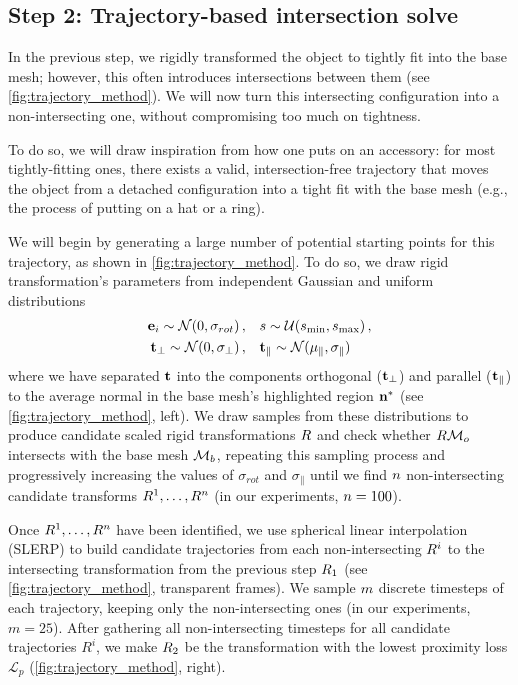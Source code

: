 \subsection{Step 2: Trajectory-based intersection solve}
\label{sec:step2}

In the previous step, we rigidly transformed the object to tightly fit into the base mesh; however, this often introduces intersections between them (see \autoref{fig:trajectory_method}). We will now turn this intersecting configuration into a non-intersecting one, without compromising too much on tightness.


To do so, we will draw inspiration from how one puts on an accessory: for most tightly-fitting ones, there exists a valid, intersection-free trajectory that moves the object from a detached configuration into a tight fit with the base mesh (e.g., the process of putting on a hat or a ring).

We will begin by generating a large number of potential starting points for this trajectory, as shown in \autoref{fig:trajectory_method}. To do so, we draw rigid transformation's parameters from independent Gaussian and uniform distributions
\begin{align*}
\mathbf{e}_i \sim \mathcal{N} (0,\sigma_{rot})\,,&\quad s \sim \mathcal{U}(s_{\min}, s_{\max})\,,\\
\mathbf{t}_{\perp} \sim \mathcal{N} (0,\sigma_{\perp})\,,&\quad \mathbf{t}_{\parallel} \sim \mathcal{N} (\mu_{\parallel},\sigma_{\parallel})
\end{align*}
where we have separated $\mathbf{t}$ into the components orthogonal ($\mathbf{t}_{\perp}$) and parallel ($\mathbf{t}_{\parallel}$) to the average normal in the base mesh's highlighted region $\mathbf{n}^*$ (see \autoref{fig:trajectory_method}, left). We draw samples from these distributions to produce candidate scaled rigid transformations $R$ and check whether $R \mathcal{M}_o$ intersects with the base mesh $\mathcal{M}_b$, repeating this sampling process and progressively increasing the values of $\sigma_{rot}$ and $\sigma_{\parallel}$ until we find $n$ non-intersecting candidate transforms $R^1,\dots,R^{n}$ (in our experiments, $n = 100$).



Once $R^1,\dots,R^{n}$ have been identified, we use spherical linear interpolation (SLERP) to build candidate trajectories from each non-intersecting $R^i$ to the intersecting transformation from the previous step $R_1$ (see \autoref{fig:trajectory_method}, transparent frames). We sample $m$ discrete timesteps of each trajectory, keeping only the non-intersecting ones (in our experiments, $m=25$). After gathering all non-intersecting timesteps for all candidate trajectories $R^i$, we make $R_2$ be the transformation with the lowest proximity loss $\mathcal{L}_{p}$ (\autoref{fig:trajectory_method}, right).

